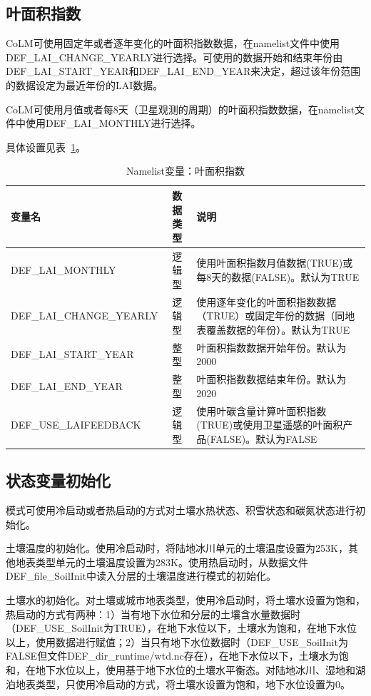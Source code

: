 \documentclass[a4paper,12pt,twoside]{article}
\begin{document}
\subsection{叶面积指数} \label{subsection_lai}

CoLM可使用固定年或者逐年变化的叶面积指数数据，在namelist文件中使用DEF\_LAI\_CHANGE\_YEARLY进行选择。可使用的数据开始和结束年份由DEF\allowbreak\_LAI\allowbreak\_START\allowbreak\_YEAR和DEF\_LAI\_END\_YEAR来决定，超过该年份范围的数据设定为最近年份的LAI数据。

CoLM可使用月值或者每8天（卫星观测的周期）的叶面积指数数据，在namelist文件中使用DEF\_LAI\_MONTHLY进行选择。

具体设置见表~\ref{table_nl_lai}。

\begin{table}[!htbp] \small
\caption{Namelist变量：叶面积指数}
\label{table_nl_lai}
\centering \renewcommand{\arraystretch}{1.5}
\begin{tabular}{lcp{}}
\toprule
\textbf{变量名} & \textbf{数据类型} & \textbf{说明} \\\midrule
DEF\_LAI\_MONTHLY & 逻辑型 & 使用叶面积指数月值数据(TRUE)或每8天的数据(FALSE)。默认为TRUE\\
DEF\_LAI\_CHANGE\_YEARLY  & 逻辑型 & 使用逐年变化的叶面积指数数据（TRUE）或固定年份的数据（同地表覆盖数据的年份）。默认为TRUE \\
DEF\_LAI\_START\_YEAR & 整型 & 叶面积指数数据开始年份。默认为2000\\
DEF\_LAI\_END\_YEAR & 整型 & 叶面积指数数据结束年份。默认为2020\\
DEF\_USE\_LAIFEEDBACK & 逻辑型 & 使用叶碳含量计算叶面积指数(TRUE)或使用卫星遥感的叶面积产品(FALSE)。默认为FALSE \\
\bottomrule
\end{tabular} 
\end{table}


\subsection{状态变量初始化}

模式可使用冷启动或者热启动的方式对土壤水热状态、积雪状态和碳氮状态进行初始化。

土壤温度的初始化。使用冷启动时，将陆地冰川单元的土壤温度设置为253K，其他地表类型单元的土壤温度设置为283K。使用热启动时，从数据文件DEF\_file\_SoilInit中读入分层的土壤温度进行模式的初始化。

土壤水的初始化。对土壤或城市地表类型，使用冷启动时，将土壤水设置为饱和，热启动的方式有两种：1）当有地下水位和分层的土壤含水量数据时（DEF\_USE\_SoilInit为TRUE），在地下水位以下，土壤水为饱和，在地下水位以上，使用数据进行赋值；2）当只有地下水位数据时（DEF\_USE\_SoilInit为FALSE但文件DEF\_dir\_runtime/wtd.nc存在），在地下水位以下，土壤水为饱和，在地下水位以上，使用基于地下水位的土壤水平衡态。对陆地冰川、湿地和湖泊地表类型，只使用冷启动的方式，将土壤水设置为饱和，地下水位设置为0。
\end{document}
